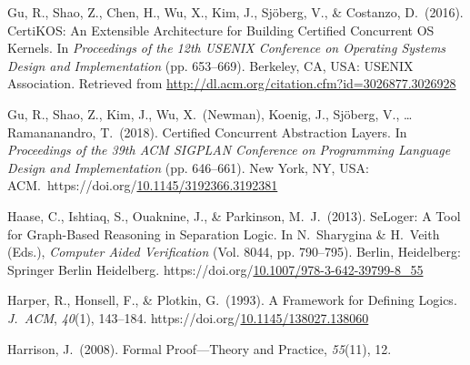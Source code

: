 \documentclass[12pt,twoside]{article}
\begin{document}
{\begin{thebibliography}{222}
\mdbibitemlabel{[Gu et al., 2016]}Gu, R., Shao, Z., Chen, H., Wu, X., Kim, J., Sjöberg, V., \& Costanzo, D.~(2016). CertiKOS: An Extensible Architecture for Building Certified Concurrent OS Kernels. In \emph{Proceedings of the 12th USENIX Conference on Operating Systems Design and Implementation} (pp. 653–669). Berkeley, CA, USA: USENIX Association. Retrieved from \href{http://dl.acm.org/citation.cfm?id=3026877.3026928}{{\ttfamily http://\hspace{0pt}dl.\hspace{0pt}acm.\hspace{0pt}org/\hspace{0pt}citation.\hspace{0pt}cfm?\hspace{0pt}id=\hspace{0pt}3026877.\hspace{0pt}3026928}}\label{gu_certikos:_2016}%

\mdbibitemlabel{[Gu et al., 2018]}Gu, R., Shao, Z., Kim, J., Wu, X.~(Newman), Koenig, J., Sjöberg, V., … Ramananandro, T.~(2018). Certified Concurrent Abstraction Layers. In \emph{Proceedings of the 39th ACM SIGPLAN Conference on Programming Language Design and Implementation} (pp. 646–661). New York, NY, USA: ACM.~https://doi.org/\href{https://dx.doi.org/10.1145/3192366.3192381}{10.1145/3192366.3192381}\label{gu_certified_2018}%

Haase, C., Ishtiaq, S., Ouaknine, J., \& Parkinson, M.~J.~(2013). SeLoger: A Tool for Graph-Based Reasoning in Separation Logic. In N.~Sharygina \& H.~Veith (Eds.), \emph{Computer Aided Verification} (Vol. 8044, pp. 790–795). Berlin, Heidelberg: Springer Berlin Heidelberg. https://doi.org/\href{https://dx.doi.org/10.1007/978-3-642-39799-8_55}{10.1007/978-3-642-39799-8\_55}\label{hutchison_seloger:_2013}%

Harper, R., Honsell, F., \& Plotkin, G.~(1993). A Framework for Defining Logics. \emph{J.~ACM}, \emph{40}(1), 143–184. https://doi.org/\href{https://dx.doi.org/10.1145/138027.138060}{10.1145/138027.138060}\label{harper_framework_1993}%

\mdbibitemlabel{[Harrison, 2008]}Harrison, J.~(2008). Formal Proof—Theory and Practice, \emph{55}(11), 12.\label{harrison_formal_2008}%


\end{thebibliography}}
\end{document}
